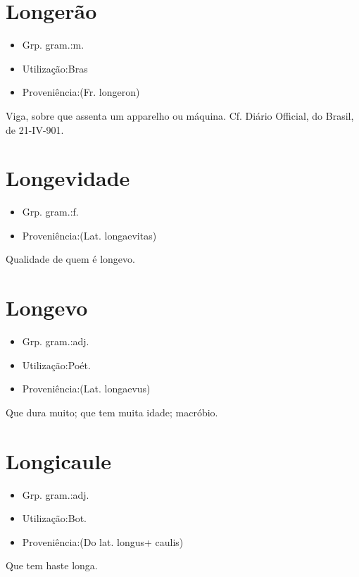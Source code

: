 \section{Longerão}
\begin{itemize}
\item {Grp. gram.:m.}
\end{itemize}
\begin{itemize}
\item {Utilização:Bras}
\end{itemize}
\begin{itemize}
\item {Proveniência:(Fr. \textunderscore longeron\textunderscore )}
\end{itemize}
Viga, sobre que assenta um apparelho ou máquina. Cf. \textunderscore Diário Official\textunderscore , do Brasil, de 21-IV-901.
\section{Longevidade}
\begin{itemize}
\item {Grp. gram.:f.}
\end{itemize}
\begin{itemize}
\item {Proveniência:(Lat. \textunderscore longaevitas\textunderscore )}
\end{itemize}
Qualidade de quem é longevo.
\section{Longevo}
\begin{itemize}
\item {Grp. gram.:adj.}
\end{itemize}
\begin{itemize}
\item {Utilização:Poét.}
\end{itemize}
\begin{itemize}
\item {Proveniência:(Lat. \textunderscore longaevus\textunderscore )}
\end{itemize}
Que dura muito; que tem muita idade; macróbio.
\section{Longicaule}
\begin{itemize}
\item {Grp. gram.:adj.}
\end{itemize}
\begin{itemize}
\item {Utilização:Bot.}
\end{itemize}
\begin{itemize}
\item {Proveniência:(Do lat. \textunderscore longus\textunderscore  + \textunderscore caulis\textunderscore )}
\end{itemize}
Que tem haste longa.

